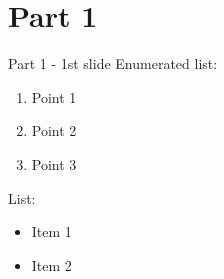 \section{Part 1}


\begin{frame}{Part 1 - 1st slide}
    Enumerated list:
    \begin{enumerate}
        \item Point 1
        \smallskip
        \item Point 2
        \smallskip
        \item Point 3
    \end{enumerate}
    \vfill

    List:
    \begin{itemize}
        \item Item 1
        \smallskip
        \item Item 2
    \end{itemize}
\end{frame}




